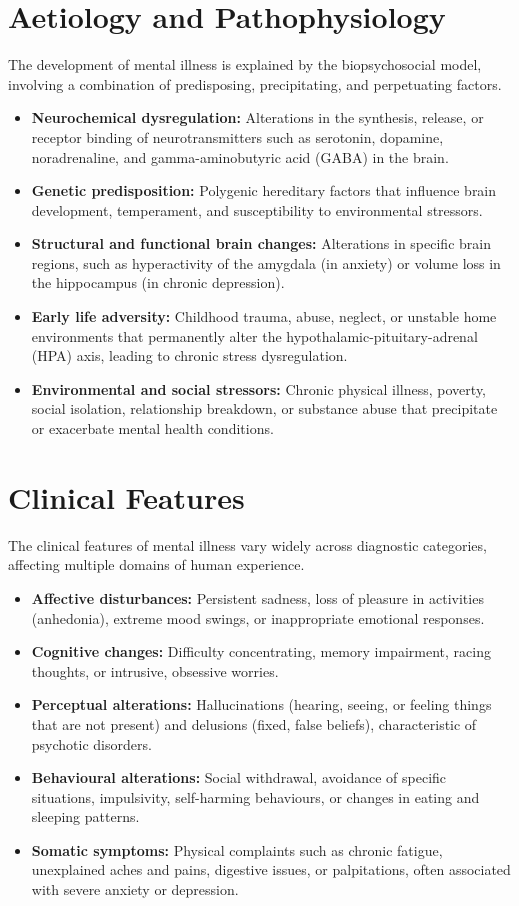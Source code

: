 \section*{Aetiology and Pathophysiology}
The development of mental illness is explained by the biopsychosocial model, involving a combination of predisposing, precipitating, and perpetuating factors.
\begin{itemize}
    \item \textbf{Neurochemical dysregulation:} Alterations in the synthesis, release, or receptor binding of neurotransmitters such as serotonin, dopamine, noradrenaline, and gamma-aminobutyric acid (GABA) in the brain.
    \item \textbf{Genetic predisposition:} Polygenic hereditary factors that influence brain development, temperament, and susceptibility to environmental stressors.
    \item \textbf{Structural and functional brain changes:} Alterations in specific brain regions, such as hyperactivity of the amygdala (in anxiety) or volume loss in the hippocampus (in chronic depression).
    \item \textbf{Early life adversity:} Childhood trauma, abuse, neglect, or unstable home environments that permanently alter the hypothalamic-pituitary-adrenal (HPA) axis, leading to chronic stress dysregulation.
    \item \textbf{Environmental and social stressors:} Chronic physical illness, poverty, social isolation, relationship breakdown, or substance abuse that precipitate or exacerbate mental health conditions.
\end{itemize}

\section*{Clinical Features}
The clinical features of mental illness vary widely across diagnostic categories, affecting multiple domains of human experience.
\begin{itemize}
    \item \textbf{Affective disturbances:} Persistent sadness, loss of pleasure in activities (anhedonia), extreme mood swings, or inappropriate emotional responses.
    \item \textbf{Cognitive changes:} Difficulty concentrating, memory impairment, racing thoughts, or intrusive, obsessive worries.
    \item \textbf{Perceptual alterations:} Hallucinations (hearing, seeing, or feeling things that are not present) and delusions (fixed, false beliefs), characteristic of psychotic disorders.
    \item \textbf{Behavioural alterations:} Social withdrawal, avoidance of specific situations, impulsivity, self-harming behaviours, or changes in eating and sleeping patterns.
    \item \textbf{Somatic symptoms:} Physical complaints such as chronic fatigue, unexplained aches and pains, digestive issues, or palpitations, often associated with severe anxiety or depression.
\end{itemize}

